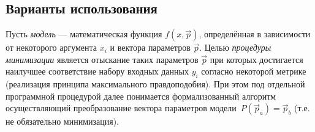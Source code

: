 \subsection{Варианты использования}

Пусть \emph{модель} --- математическая
функция $f(x,\vec{p})$, определённая в зависимости от некоторого
аргумента $x_i$ и вектора параметров $\vec{p}$. Целью
\emph{процедуры минимизации} является отыскание таких параметров $\vec{p}$
при которых достигается наилучшее соответствие набору входных данных $y_i$
согласно некоторой метрике (реализация принципа максимального правдоподобия).
При этом под отдельной программной процедурой далее понимается
формализованный алгоритм осуществляющий преобразование вектора параметров
модели~$P(\vec{p}_a) = \vec{p}_b$ (т.е. не обязательно минимизация).

